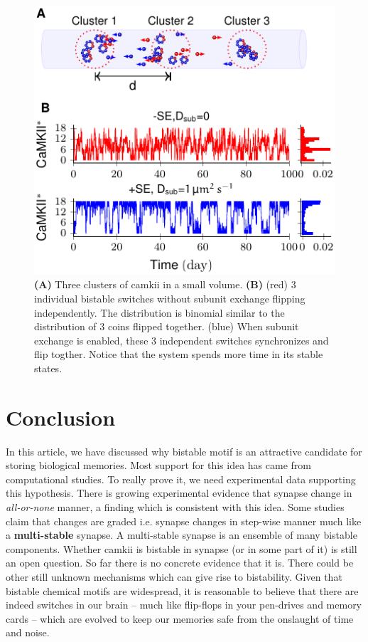\documentclass[]{resonance}
\begin{document}
\begin{figure}[h!]
    \caption{ \textbf{(A)} Three clusters of \gls{camkii} in a small volume.
        \textbf{(B)} (red) 3 individual bistable switches without subunit
        exchange flipping independently. The distribution is binomial similar to
        the distribution of 3 coins flipped together. (blue) When subunit
        exchange is enabled, these 3 independent switches synchronizes and flip
        togther. Notice that the system spends more time in its stable states.
    }\label{fig:camkii_summary}
    \centering
    \includegraphics[width=0.85\linewidth]{./sync.png}
\end{figure}


\section{Conclusion}

In this article, we have discussed why bistable motif is an attractive candidate
for storing biological memories. Most support for this idea has came from
computational studies. To really prove it, we need experimental data supporting
this hypothesis. There is growing experimental evidence that synapse change in
\textit{all-or-none} manner, a finding which is consistent with this idea. Some
studies claim that changes are graded i.e. synapse changes in step-wise manner
much like a \textbf{multi-stable} synapse. A multi-stable synapse is an ensemble
of many bistable components. Whether \gls{camkii} is bistable in synapse (or in
some part of it) is still an open question. So far there is no concrete evidence
that it is. There could be other still unknown mechanisms which can give rise to
bistability. Given that bistable chemical motifs are widespread, it is
reasonable to believe that there are indeed switches in our brain -- much like
flip-flops in your pen-drives and memory cards -- which are evolved to keep our
memories safe from the onslaught of time and noise.
\end{document}
